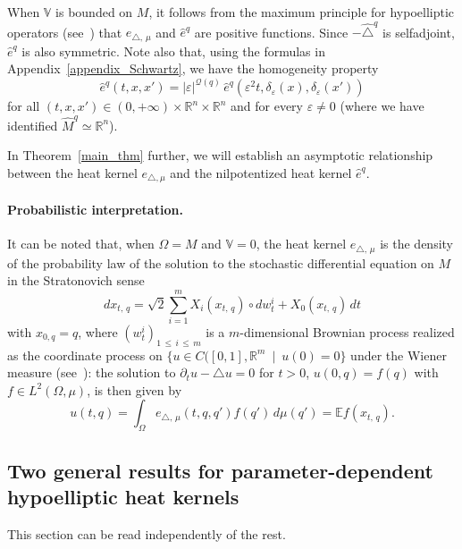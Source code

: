 \documentclass[AHL,Unicode,published]{cedram}
\newcommand*\R{\mathbb{R}}
\newcommand{\bbV}{\mathbb{V}}
\newcommand{\bbE}{\mathbb{E}}
\newcommand{\calQ}{\mathcal{Q}}
\renewcommand{\leq}{\leqslant}
\begin{document}
When $\bbV$ is bounded on $M$, it follows from the maximum principle for hypoelliptic operators (see~\cite{Bony}) that $e_{\triangle,\,\mu}$ and $\widehat{e}^{q}$ are positive functions. Since $-\widehat\triangle^{q}$ is selfadjoint, $\widehat{e}^{q}$ is also symmetric. Note also that, using the formulas in Appendix~\ref{appendix_Schwartz}, we have the homogeneity property
\begin{equation}\label{homog_nilp}
\widehat{e}^{q}(t,x,x') = \vert\varepsilon\vert^{\calQ(q)}\, \widehat{e}^{q}\left(\varepsilon^2 t,\delta_\varepsilon(x),\delta_\varepsilon(x')\right)
\end{equation}
for all $(t,x,x')\in(0,+\infty)\times\R^n\times\R^n$ and for every $\varepsilon\neq 0$ (where we have identified $\widehat{M}^{q}\simeq\R^n$).

In Theorem~\ref{main_thm} further, we will establish an asymptotic relationship between the heat kernel $e_{\triangle,\mu}$ and the nilpotentized heat kernel $\widehat{e}^{q}$.

\paragraph{Probabilistic interpretation.}
It can be noted that, when $\Omega=M$ and $\bbV=0$, the heat kernel $e_{\triangle,\,\mu}$ is the density of the probability law of the solution to the stochastic differential equation on $M$ in the Stratonovich sense
\[
dx_{t,\,q} = \sqrt{2}\sum_{i=1}^m X_i(x_{t,\,q})\circ dw_t^i + X_0(x_{t,\,q})\, dt
\]
with $x_{0,q}=q$, where $(w_t^i)_{1\,\leq\,i\,\leq\,m}$ is a $m$-dimensional Brownian process realized as the coordinate process on $\{u\in C([0,1],\R^m\ \mid\ u(0)=0\}$ under the Wiener measure (see~\cite{BenArous_AIF1989}): the solution to $\partial_t u-\triangle u=0$ for $t>0$, $u(0,q)=f(q)$ with $f\in L^2(\Omega,\mu)$, is then given by
\[
u(t,q) = \int_\Omega e_{\triangle,\,\mu}(t,q,q')f(q')\, d\mu(q') = \bbE f(x_{t,\,q}).
\]


\subsection{Two general results for parameter-dependent hypoelliptic heat kernels}\label{sec_two_general_results}

This section can be read independently of the rest.
\end{document}
